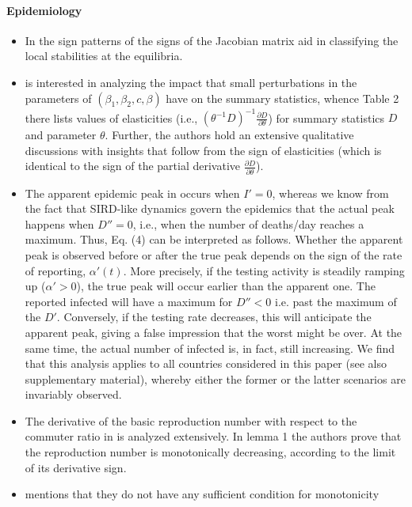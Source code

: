\documentclass[11pt]{book}
\begin{document}
\paragraph{Epidemiology}
\begin{itemize}
\item In \cite{arino2010effect}
the sign patterns of the signs of the Jacobian matrix aid in classifying
the local stabilities at the equilibria.
\item \cite{gomez2018perturbation}
is interested in analyzing the impact that small perturbations in
the parameters of $\left(\beta_{1},\beta_{2},c,\beta\right)$ have
on the summary statistics, whence Table 2 there lists values of elasticities
(i.e., $\left(\theta^{-1}D\right)^{-1}\frac{\partial D}{\partial\theta}$)
for summary statistics $D$ and parameter $\theta$. Further, the
authors hold an extensive qualitative discussions with insights that
follow from the sign of elasticities (which is identical to the sign
of the partial derivative $\frac{\partial D}{\partial\theta}$).
\item The apparent epidemic peak in \cite{carletti2020covid}
occurs when $I'=0$, whereas we know from the fact that SIRD-like
dynamics govern the epidemics that the actual peak happens when $D''=0$,
i.e., when the number of deaths/day reaches a maximum. Thus, Eq. (4)
can be interpreted as follows. Whether the apparent peak is observed
before or after the true peak depends on the sign of the rate of reporting,
$\alpha'\left(t\right)$. More precisely, if the testing activity
is steadily ramping up ($\alpha'>0$), the true peak will occur earlier
than the apparent one. The reported infected will have a maximum for
$D''<0$ i.e. past the maximum of the $D'$. Conversely, if the testing
rate decreases, this will anticipate the apparent peak, giving a false
impression that the worst might be over. At the same time, the actual
number of infected is, in fact, still increasing. We find that this
analysis applies to all countries considered in this paper (see also
supplementary material), whereby either the former or the latter scenarios
are invariably observed.
\item The derivative of the basic reproduction number with respect to the
commuter ratio in \cite{seno2020sis}
is analyzed extensively. In lemma 1 the authors prove that the reproduction
number is monotonically decreasing, according to the limit of its
derivative sign.
\item \cite{ascione2020construction}
mentions that they do not have any sufficient condition for monotonicity

\end{itemize}
\end{document}

